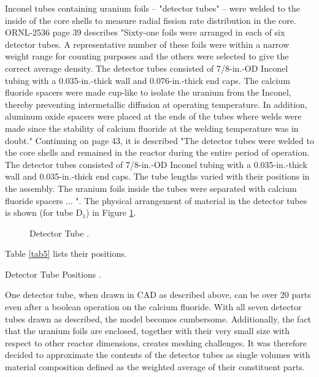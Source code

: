 \documentclass[ms,a4paper]{memoir}
\begin{document}
Inconel tubes containing uranium foils -- "detector tubes" -- were welded to the inside of the core shells to measure radial fission rate distribution in the core. ORNL-2536 page 39 describes "Sixty-one foils were arranged in each of six detector tubes. A representative number of these foils were within a narrow weight range for counting purposes and the others were selected to give the correct average density. The detector tubes consisted of 7/8-in.-OD Inconel tubing with a 0.035-in.-thick wall and 0.076-in.-thick end caps. The calcium fluoride spacers were made cup-like to isolate the uranium from the Inconel, thereby preventing intermetallic diffusion at operating temperature. In addition, aluminum oxide spacers were placed at the ends of the tubes where welds were made since the stability of calcium fluoride at the welding temperature was in doubt." Continuing on page 43, it is described "The detector tubes were welded to the core shells and remained in the reactor during the entire period of operation. The detector tubes consisted of 7/8-in.-OD Inconel tubing with a 0.035-in.-thick wall and 0.035-in.-thick end caps. The tube lengths varied with their positions in the assembly. The uranium foils inside the tubes were separated with calcium fluoride spacers ... ". The physical arrangement of material in the detector tubes is shown (for tube D$_1$) in Figure \ref{fig7}.

\begin{figure}[H]
  \centering
  \caption{Detector Tube \parencite[Figure 21]{ornl-2536}.}
  \label{fig7}
\end{figure}

Table \ref{tab5} lists their positions.

\begin{table}[H]
  \centering
  \caption{Detector Tube Positions \parencite[Table 15]{ornl-2536}.}
  \label{tab5}
\end{table}

One detector tube, when drawn in CAD as described above, can be over 20 parts even after a boolean operation on the calcium fluoride. With all seven detector tubes drawn as described, the model becomes cumbersome. Additionally, the fact that the uranium foils are enclosed, together with their very small size with respect to other reactor dimensions, creates meshing challenges. It was therefore decided to approximate the contents of the detector tubes as single volumes with material composition defined as the weighted average of their constituent parts.
\end{document}
